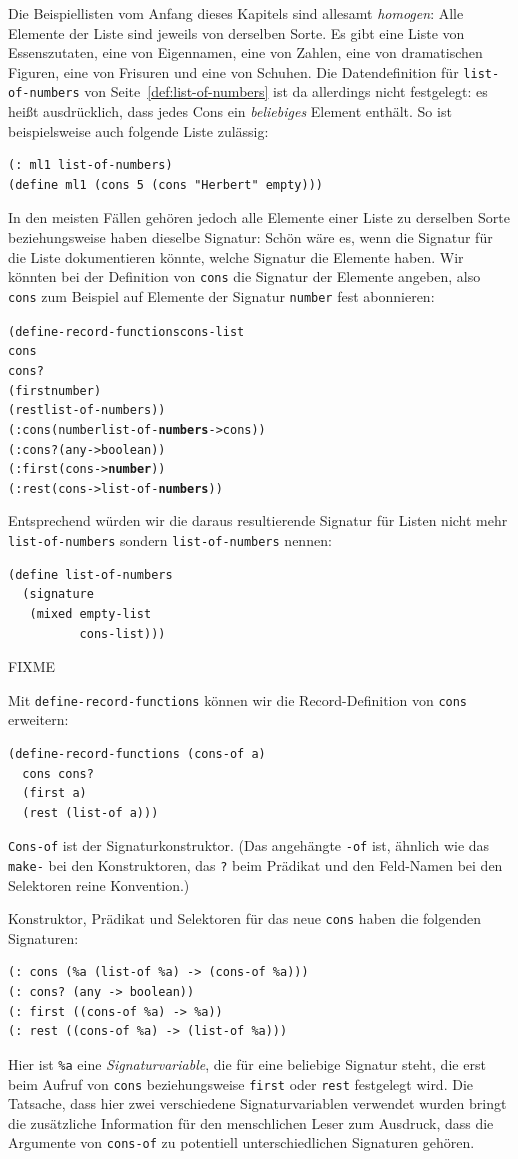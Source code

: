 Die Beispiellisten vom Anfang dieses Kapitels sind allesamt
\textit{homogen}: Alle Elemente der Liste sind jeweils
von derselben Sorte.  Es gibt eine Liste von Essenszutaten, eine von
Eigennamen, eine von Zahlen, eine von dramatischen Figuren, eine von
Frisuren und eine von Schuhen.  Die Datendefinition für
\texttt{list-of-numbers} von Seite~\ref{def:list-of-numbers} ist da allerdings nicht
festgelegt: es heißt ausdrücklich, dass jedes Cons ein
\emph{beliebiges} Element enthält.  So ist beispielsweise auch
folgende Liste zulässig:
%
\begin{verbatim}
(: ml1 list-of-numbers)
(define ml1 (cons 5 (cons "Herbert" empty)))
\end{verbatim}
%
In den meisten Fällen gehören jedoch alle Elemente einer Liste zu
derselben Sorte beziehungsweise haben dieselbe Signatur: Schön wäre
es, wenn die Signatur für die Liste dokumentieren könnte, welche
Signatur die Elemente haben.  Wir könnten bei
der Definition von \texttt{cons} die Signatur der Elemente angeben,
also \texttt{cons} zum Beispiel auf Elemente der Signatur
\texttt{number} fest abonnieren: 
%
\begin{alltt}
(define-record-functions cons-list
  cons
  cons?
  (first number)
  (rest  list-of-numbers))
(: cons (number list-of-\textbf{numbers} -> cons))
(: cons? (any -> boolean))
(: first (cons -> \textbf{number}))
(: rest (cons -> list-of-\textbf{numbers}))
\end{alltt}
%
Entsprechend würden wir die daraus resultierende Signatur für Listen
nicht mehr \texttt{list-of-numbers} sondern \texttt{list-of-numbers} nennen:
%
\begin{verbatim}
(define list-of-numbers
  (signature
   (mixed empty-list
          cons-list)))
\end{verbatim}
%

FIXME

Mit
\texttt{define-record-functions} können wir die
Record-Definition von \texttt{cons} erweitern:
%
\begin{verbatim}
(define-record-functions (cons-of a)
  cons cons?
  (first a)
  (rest (list-of a)))
\end{verbatim}
%
\texttt{Cons-of} ist der Signaturkonstruktor.  (Das angehängte
\texttt{-of} ist, ähnlich wie das \texttt{make-} bei den
Konstruktoren, das \texttt{?} beim Prädikat und den Feld-Namen bei den
Selektoren reine Konvention.)

Konstruktor, Prädikat
und Selektoren für das neue \texttt{cons} haben die folgenden
Signaturen:
%
\begin{verbatim}
(: cons (%a (list-of %a) -> (cons-of %a)))
(: cons? (any -> boolean))
(: first ((cons-of %a) -> %a))
(: rest ((cons-of %a) -> (list-of %a)))
\end{verbatim}
%
Hier ist  \verb|%a| eine
\textit{Signaturvariable}, die für eine beliebige
Signatur steht, die erst beim Aufruf von \texttt{cons} beziehungsweise
\texttt{first} oder \texttt{rest} festgelegt wird.
Die Tatsache, dass hier zwei verschiedene Signaturvariablen
verwendet wurden bringt die zusätzliche Information für den
menschlichen Leser zum Ausdruck, dass die
Argumente von \texttt{cons-of} zu potentiell
unterschiedlichen Signaturen gehören.

